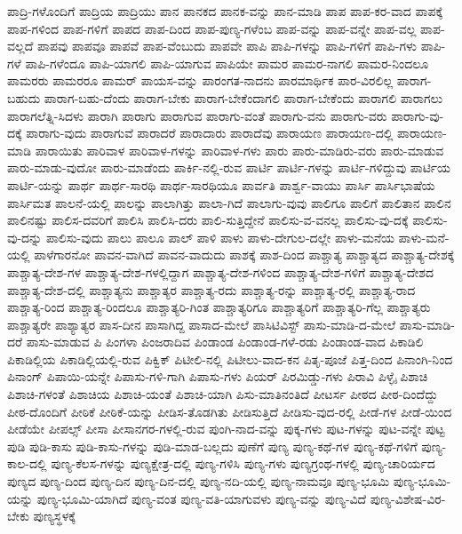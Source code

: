 {ಪಾದ್ರಿ-ಗಳೊಂದಿಗೆ
ಪಾದ್ರಿಯ
ಪಾದ್ರಿಯು
ಪಾನ
ಪಾನಕದ
ಪಾನಕ-ವನ್ನು
ಪಾನ-ಮಾಡಿ
ಪಾಪ
ಪಾಪ-ಕರ-ವಾದ
ಪಾಪಕ್ಕೆ
ಪಾಪ-ಗಳಿಂದ
ಪಾಪ-ಗಳಿಗೆ
ಪಾಪದ
ಪಾಪ-ದಿಂದ
ಪಾಪ-ಪುಣ್ಯ-ಗಳೆಂಬ
ಪಾಪ-ವನ್ನು
ಪಾಪ-ವನ್ನೇ
ಪಾಪ-ವಲ್ಲ
ಪಾಪ-ವಲ್ಲದೆ
ಪಾಪವು
ಪಾಪವೂ
ಪಾಪವೆ
ಪಾಪ-ವೆಂಬುದು
ಪಾಪವೇ
ಪಾಪಿ
ಪಾಪಿ-ಗಳನ್ನು
ಪಾಪಿ-ಗಳಿಗೆ
ಪಾಪಿ-ಗಳು
ಪಾಪಿ-ಗಳೆ
ಪಾಪಿ-ಗಳೆಂದೂ
ಪಾಪಿ-ಯಾಗಲಿ
ಪಾಪಿ-ಯಾಗುವ
ಪಾಪಿಯೇ
ಪಾಮರ
ಪಾಮರ-ನಾಗಲಿ
ಪಾಮರ-ನಿಂದಲೂ
ಪಾಮರರು
ಪಾಮರರೂ
ಪಾಮರ್
ಪಾಯಸ-ವನ್ನು
ಪಾರಂಗತ-ನಾದನು
ಪಾರಮಾರ್ಥಿಕ
ಪಾರ-ವಿರಲಿಲ್ಲ
ಪಾರಾಗ-ಬಹುದು
ಪಾರಾಗ-ಬಹು-ದೆಂದು
ಪಾರಾಗ-ಬೇಕು
ಪಾರಾಗ-ಬೇಕೆಂದಾಗಲಿ
ಪಾರಾಗ-ಬೇಕೆಂದು
ಪಾರಾಗಲಿ
ಪಾರಾಗಲು
ಪಾರಾಗಲೆತ್ನಿ-ಸಿದಳು
ಪಾರಾಗಿ
ಪಾರಾಗು
ಪಾರಾಗುವ
ಪಾರಾಗು-ವಂತೆ
ಪಾರಾಗು-ವನು
ಪಾರಾಗು-ವರು
ಪಾರಾಗು-ವು-ದಕ್ಕೆ
ಪಾರಾಗು-ವುದು
ಪಾರಾಗುವೆ
ಪಾರಾದರೆ
ಪಾರಾದಾರು
ಪಾರಾದೆವು
ಪಾರಾಯಣ
ಪಾರಾಯಣ-ದಲ್ಲಿ
ಪಾರಾಯಣ-ಮಾಡಿ
ಪಾರಾಯಿತು
ಪಾರಿವಾಳ
ಪಾರಿವಾಳ-ಗಳನ್ನು
ಪಾರಿವಾಳ-ಗಳು
ಪಾರು
ಪಾರು-ಮಾಡಿರು-ವರು
ಪಾರು-ಮಾಡುವ
ಪಾರು-ಮಾಡು-ವುದೋ
ಪಾರು-ಮಾಡೆಂದು
ಪಾರ್ಕಿ-ನಲ್ಲಿ-ರುವ
ಪಾರ್ಟಿ
ಪಾರ್ಟಿ-ಗಳನ್ನು
ಪಾರ್ಟಿ-ಗಳಿದ್ದುವು
ಪಾರ್ಟಿಯ
ಪಾರ್ಟಿ-ಯನ್ನು
ಪಾರ್ಥ
ಪಾರ್ಥ-ಸಾರಥಿ
ಪಾರ್ಥ-ಸಾರಥಿಯೂ
ಪಾರ್ವತಿ
ಪಾರ್ಶ್ವ-ವಾಯು
ಪಾರ್ಸಿ
ಪಾರ್ಸಿಭಾಷೆಯ
ಪಾರ್ಸಿಮತ
ಪಾಲನೆ-ಯಲ್ಲಿ
ಪಾಲನ್ನು
ಪಾಲಾಗಿತ್ತು
ಪಾಲಾ-ಗಿದೆ
ಪಾಲಾಗು-ವುವು
ಪಾಲಿಗೂ
ಪಾಲಿಗೆ
ಪಾಲಿತಾನ
ಪಾಲಿನ
ಪಾಲಿನಷ್ಟು
ಪಾಲಿಸ-ದವರಿಗೆ
ಪಾಲಿಸಿ
ಪಾಲಿಸಿ-ದರು
ಪಾಲಿ-ಸುತ್ತಿದ್ದೇನೆ
ಪಾಲಿಸು-ವ-ವನಲ್ಲ
ಪಾಲಿಸು-ವು-ದಕ್ಕೆ
ಪಾಲಿಸು-ವು-ದನ್ನು
ಪಾಲಿಸು-ವುದು
ಪಾಲು
ಪಾಲೂ
ಪಾಲ್
ಪಾಳಿ
ಪಾಳು
ಪಾಳು-ದೇಗುಲ-ದಲ್ಲೇ
ಪಾಳು-ಮನೆಯ
ಪಾಳು-ಮನೆ-ಯಲ್ಲಿ
ಪಾಳೆಗಾರನೋ
ಪಾವನ-ವಾಗಿದೆ
ಪಾವನ-ವಾದುದು
ಪಾಶಕ್ಕೆ
ಪಾಶ-ದಿಂದ
ಪಾಶ್ಚಾತ್ಯ
ಪಾಶ್ಚಾತ್ಯದ
ಪಾಶ್ಚಾತ್ಯ-ದೇಶಕ್ಕೆ
ಪಾಶ್ಚಾತ್ಯ-ದೇಶ-ಗಳ
ಪಾಶ್ಚಾತ್ಯ-ದೇಶ-ಗಳಲ್ಲಿದ್ದಾಗ
ಪಾಶ್ಚಾತ್ಯ-ದೇಶ-ಗಳಿಂದ
ಪಾಶ್ಚಾತ್ಯ-ದೇಶ-ಗಳಿಗೆ
ಪಾಶ್ಚಾತ್ಯ-ದೇಶದ
ಪಾಶ್ಚಾತ್ಯ-ದೇಶ-ದಲ್ಲಿ
ಪಾಶ್ಚಾತ್ಯನು
ಪಾಶ್ಚಾತ್ಯರ
ಪಾಶ್ಚಾತ್ಯ-ರದು
ಪಾಶ್ಚಾತ್ಯ-ರನ್ನು
ಪಾಶ್ಚಾತ್ಯ-ರಲ್ಲಿ
ಪಾಶ್ಚಾತ್ಯ-ರಾದ
ಪಾಶ್ಚಾತ್ಯ-ರಿಂದ
ಪಾಶ್ಚಾತ್ಯ-ರಿಂದಲೂ
ಪಾಶ್ಚಾತ್ಯರಿ-ಗಿಂತ
ಪಾಶ್ಚಾತ್ಯರಿಗೂ
ಪಾಶ್ಚಾತ್ಯರಿಗೆ
ಪಾಶ್ಚಾತ್ಯರಿ-ಗೆಲ್ಲ
ಪಾಶ್ಚಾತ್ಯರು
ಪಾಶ್ಚಾತ್ಯರೇ
ಪಾಶ್ಯಾತ್ಯರ
ಪಾಸ-ದೀನ
ಪಾಸಾಗಿದ್ದ
ಪಾಸಾದ-ಮೇಲೆ
ಪಾಸಿಟಿವಿಸ್ಟ್
ಪಾಸು-ಮಾಡಿ-ದ-ಮೇಲೆ
ಪಾಸು-ಮಾಡಿ-ದರೆ
ಪಾಸು-ಮಾಡುವ
ಪಿ
ಪಿಂಗಳಾ
ಪಿಂಜರಾದಿವ
ಪಿಂಡಾಂಡ
ಪಿಂಡಾಂಡ-ಗಳೆ-ರಡು
ಪಿಂಡಾಂಡ-ವಾದ
ಪಿಕಾಡಿಲಿ
ಪಿಕಾಡಿಲ್ಲಿಯ
ಪಿಕಾಡಿಲ್ಲಿಯಲ್ಲಿ-ರುವ
ಪಿಕ್ವಿಕ್
ಪಿಟೀಲಿ-ನಲ್ಲಿ
ಪಿಟೀಲು-ವಾದ-ಕನ
ಪಿತೃ-ಪೂಜೆ
ಪಿತ್ತ-ದಿಂದ
ಪಿನಾಂಗಿ-ನಿಂದ
ಪಿನಾಂಗ್
ಪಿಪಾಯಿ-ಯನ್ನೇ
ಪಿಪಾಸು-ಗಳಿ-ಗಾಗಿ
ಪಿಪಾಸು-ಗಳು
ಪಿಯರ್
ಪಿರಮಿಡ್ಡು-ಗಳು
ಪಿರಾವಿ
ಪಿಳ್ಳೈ
ಪಿಶಾಚಿ
ಪಿಶಾಚಿ-ಗಳಂತೆ
ಪಿಶಾಚಿಯ
ಪಿಶಾಚಿ-ಯಂತೆ
ಪಿಶಾಚಿ-ಯಾಗಿ
ಪಿಸು-ಮಾತಿನಂತಿದೆ
ಪೀಟರ್ಸ
ಪೀಠದ
ಪೀಠ-ದಿಂದೆದ್ದು
ಪೀಠ-ದೊಂದಿಗೆ
ಪೀಠಿಕೆ
ಪೀಠಿಕೆ-ಯನ್ನು
ಪೀಡಿಸ-ತೊಡಗಿತು
ಪೀಡಿಸುತ್ತಿದೆ
ಪೀಡಿಸು-ವುದ-ರಲ್ಲಿ
ಪೀಡೆ-ಗಳ
ಪೀಡೆ-ಯಿಂದ
ಪೀಡೆಯೇ
ಪೀಪಲ್ಸ್
ಪೀಸಾ
ಪೀಸಾನಗರ-ಗಳಲ್ಲಿ-ರುವ
ಪುಂಗಿ-ನಾದ-ವನ್ನು
ಪುಕ್ಕ-ಗಳು
ಪುಟ-ಗಳನ್ನು
ಪುಟ-ವನ್ನೇ
ಪುಟ್ಟ
ಪುಡಿ
ಪುಡಿ-ಕಾಸು
ಪುಡಿ-ಕಾಸು-ಗಳನ್ನು
ಪುಡಿ-ಮಾಡ-ಬಲ್ಲದು
ಪುಣೆಗೆ
ಪುಣ್ಯ
ಪುಣ್ಯ-ಕಥೆ-ಗಳ
ಪುಣ್ಯ-ಕಥೆ-ಗಳಿಗೆ
ಪುಣ್ಯ-ಕಾಲ-ದಲ್ಲಿ
ಪುಣ್ಯ-ಕೆಲಸ-ಗಳನ್ನು
ಪುಣ್ಯಕ್ಷೇತ್ರ-ದಲ್ಲಿ
ಪುಣ್ಯ-ಗಳಿಸಿ
ಪುಣ್ಯ-ಗಳು
ಪುಣ್ಯಗ್ರಂಥ-ಗಳಲ್ಲಿ
ಪುಣ್ಯ-ಚಾರಿರ್ಯದ
ಪುಣ್ಯದ
ಪುಣ್ಯ-ದಿಂದ
ಪುಣ್ಯ-ದಿನ
ಪುಣ್ಯ-ದಿನ-ದಲ್ಲಿ
ಪುಣ್ಯ-ನದಿ-ಯಲ್ಲಿ
ಪುಣ್ಯ-ನಾಮವೂ
ಪುಣ್ಯ-ಭೂಮಿ
ಪುಣ್ಯ-ಭೂಮಿ-ಯನ್ನು
ಪುಣ್ಯ-ಭೂಮಿ-ಯಾಗಿದೆ
ಪುಣ್ಯ-ವಂತ
ಪುಣ್ಯ-ವತಿ-ಯಾಗುವಳು
ಪುಣ್ಯ-ವನ್ನು
ಪುಣ್ಯ-ವಿದೆ
ಪುಣ್ಯ-ವಿಶೇಷ-ವಿರ-ಬೇಕು
ಪುಣ್ಯಸ್ಥಳಕ್ಕೆ
}
